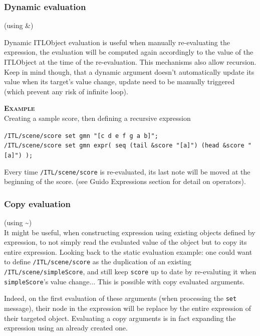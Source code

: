\documentclass[a4paper,twoside]{report}
\newcommand{\OSC}[1]		{\texttt{#1}}
\newcommand{\example}		{\textbf{\hspace{-1.5cm}\textbf{\textsc{Example }}}}
\newcommand{\lowTilde} 		{\textasciitilde}
\newcommand{\sample}	[1]			{\vspace{-2mm}\begin{center}\colorbox{mygrey}{
								\begin{minipage}[t]{0.9\columnwidth} 
								{\small \texttt{#1}}
								\end{minipage}}\end{center}}
\begin{document}
\subsubsection*{Dynamic evaluation} (using \&)

Dynamic ITLObject evaluation is useful when manually re-evaluating the expression, the evaluation will be computed again accordingly to the value of the ITLObject at the time of the re-evaluation. This mechanisms also allow recursion. Keep in mind though, that a dynamic argument doesn't automatically update its value when its target's value change, update need to be manually triggered (which prevent any risk of infinite loop).

\example\\
Creating a sample score, then defining a recursive expression
\sample {/ITL/scene/score set gmn "[c d e f g a b]";\\
/ITL/scene/score set gmn expr( seq (tail \&score "[a]") (head \&score "[a]") );
}
Every time \OSC{/ITL/scene/score} is re-evaluated, its last note will be moved at the beginning of the score. (see Guido Expressions section for detail on operators).

\subsubsection*{Copy evaluation} (using \lowTilde)\\
It might be useful, when constructing expression using existing objects defined by expression, to not simply read the evaluated value of the object but to copy its entire expression. Looking back to the static evaluation example: one could want to define \OSC{/ITL/scene/score} as the duplication of an existing \OSC{/ITL/scene/simpleScore}, and still keep \OSC{score} up to date by re-evaluting  it when \OSC{simpleScore}'s value change... This is possible with copy evaluated arguments.

Indeed, on the first evaluation of these arguments (when processing the \OSC{set} message), their node in the expression will be replace by the entire expression of their targeted object. Evaluating a copy arguments is in fact expanding the expression using an already created one.
\end{document}
